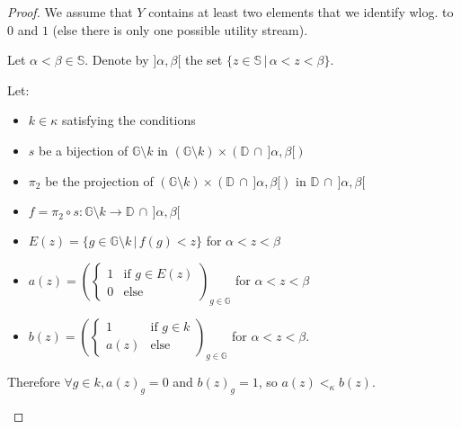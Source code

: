 \documentclass{article}
\begin{document}
\begin{proof}
  We assume that $Y$ contains at least two elements that we identify wlog. to $0$
  and $1$ (else there is only one possible utility stream).

  Let $\alpha<\beta\in\mathbb S$. Denote by $]\alpha,\beta[$ the set $\{z\in\mathbb S\,|\, \alpha<z<\beta\}$.

  Let:
  \begin{itemize}
  \item $k\in\kappa$ satisfying the conditions
  \item $s$ be a bijection of $\mathbb G\setminus k$ in $(\mathbb G\setminus k)\times
        (\mathbb D\,\cap\,]\alpha,\beta[)$
  \item $\pi_2$ be the projection of $(\mathbb G\setminus k)\times (\mathbb D\,\cap\,]\alpha,\beta[)$
        in $\mathbb D\,\cap\,]\alpha,\beta[$
  \item $f=\pi_2\circ s:\mathbb G\setminus k\to\mathbb D\,\cap\,]\alpha,\beta[$
  \item $E(z)=\{g\in \mathbb G\setminus k\,|\, f(g)<z\}$ for $\alpha<z<\beta$
  \item $\displaystyle a(z)=\left(\left\{\begin{array}{ll}1&\text{if }g\in
        E(z)\\0&\text{else}\end{array}\right.\right)_{g\in\mathbb G}$ for $\alpha<z<\beta$
  \item $\displaystyle b(z)=\left(\left\{\begin{array}{ll}1&\text{if }g\in
        k\\a(z)&\text{else}\end{array}\right.\right)_{g\in\mathbb G}$ for $\alpha<z<\beta$.
  \end{itemize}

  Therefore $\forall g\in k, a(z)_g=0$ and $b(z)_g=1$, so $a(z)<_\kappa b(z)$.

  \begin{center}
  \end{center}


\end{proof}
\end{document}

